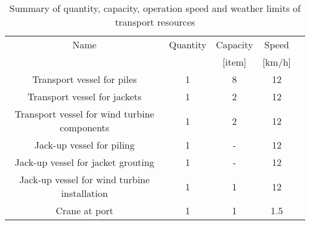 \begin{table}
\label{tab:input}
\begin{tabular}{ccccc}
\hline 
Name & Quantity & Capacity & Speed \\
 & & [item] & [km/h] \\ 
\hline 
Transport vessel for piles & 1 & 8 & 12 \\ 
Transport vessel for jackets & 1 & 2 & 12 \\ 
Transport vessel for wind turbine components & 1 & 2 & 12 \\ 
Jack-up vessel for piling & 1 & - & 12\\
Jack-up vessel for jacket grouting & 1 & - & 12\\
Jack-up vessel for wind turbine installation & 1 & 1 & 12 \\
Crane at port & 1 & 1 & 1.5 \\
\hline 
\end{tabular}

\caption{Summary of quantity, capacity, operation speed and weather limits of transport resources}
\end{table}

